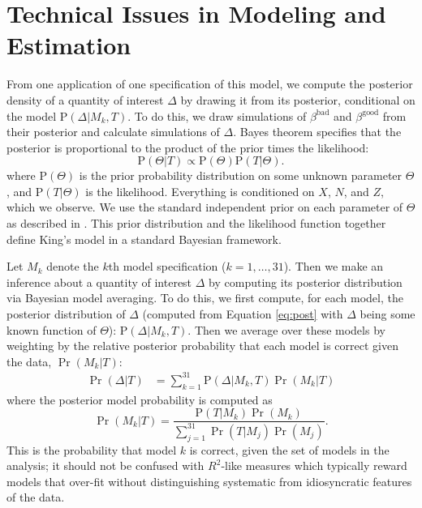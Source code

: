 \documentclass[11pt,titlepage]{article}
\renewcommand{\P}{\text{P}}
\newcommand{\bb}{\beta^{\text{bad}}}
\newcommand{\bg}{\beta^{\text{good}}}
\begin{document}
\appendix
\section{Technical Issues in Modeling and Estimation} \label{appx:king}

From one application of one specification of this model, we compute
the posterior density of a quantity of interest $\Delta$ by drawing it
from its posterior, conditional on the model $\P(\Delta|M_k,T)$.  To
do this, we draw simulations of $\bb$ and $\bg$ from their posterior
and calculate simulations of $\Delta$.  Bayes theorem specifies that
the posterior is proportional to the product of the prior times the
likelihood:
\begin{equation}
  \P(\Theta|T) \propto \P(\Theta)\P(T|\Theta).\label{eq:post}
\end{equation}
where $\P(\Theta)$ is the prior probability distribution on some
unknown parameter $\Theta$, and $\P(T|\Theta)$ is the likelihood.
Everything is conditioned on $X$, $N$, and $Z$, which we observe.  We
use the standard independent prior on each parameter of $\Theta$ as
described in \citet{king:97}.  This prior distribution and the
likelihood function together define King's model in a standard
Bayesian framework.

Let $M_k$ denote the $k$th model specification ($k=1,\dots,31$). Then
we make an inference about a quantity of interest $\Delta$ by
computing its posterior distribution via Bayesian model averaging.  To
do this, we first compute, for each model, the posterior distribution
of $\Delta$ (computed from Equation \ref{eq:post} with $\Delta$ being
some known function of $\Theta$): $\P(\Delta|M_k,T)$.  Then we average
over these models by weighting by the relative posterior probability
that each model is correct given the data, $\Pr(M_k|T)$:
\begin{align} \label{eq:bma}
  \Pr(\Delta|T) %
                &= \sum_{k=1}^{31} \P(\Delta|M_k,T) \Pr(M_k|T)
\end{align}
where the posterior model probability is computed as
\begin{equation}
  \Pr(M_k|T)=\frac{\P(T|M_k)\Pr(M_k)}
             {\sum_{j=1}^{31} \Pr(T|M_j) \Pr(M_j)}.  \label{eq:postmodel}
\end{equation}
This is the probability that model $k$ is correct, given the set of
models in the analysis; it should not be confused with $R^2$-like
measures which typically reward models that over-fit without
distinguishing systematic from idiosyncratic features of the data.
\end{document}
